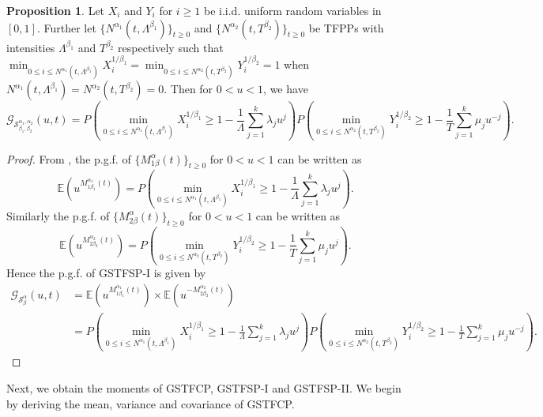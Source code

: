 \documentclass[11pt,oneside,reqno]{amsart}
\theoremstyle{definition}
\newtheorem{proposition}{Proposition}[section]
\theoremstyle{remarkstyle}
\begin{document}
\begin{proposition}
Let $X_i$ and $Y_i$ for $i\ge 1$ be i.i.d. uniform random variables in $[0,1]$. Further let $\{N^{\alpha_1}(t,\Lambda^{\beta_1})\}_{t\ge 0}$ and $\{N^{\alpha_2}(t,T^{\beta_2})\}_{t\ge 0}$ be TFPPs with intensities $\Lambda^{\beta_1}$ and $T^{\beta_2}$ respectively such that $\min_{0\le i\le N^{\alpha_1}(t,\Lambda^{\beta_1})}X^{1/\beta_1}_{i}=\min_{0\le i\le N^{\alpha_2}(t,T^{\beta_2})}Y^{1/\beta_2}_{i}=1$ when $N^{\alpha_1}(t,\Lambda^{\beta_1})=N^{\alpha_2}(t,T^{\beta_2})=0$. Then for $0<u<1$, we have
\begin{equation*}
\mathcal{G}_{\mathcal{S}^{\alpha_1,\alpha_2}_{\beta_1,\beta_2}}(u,t)=P(\min_{0\le i\le N^{\alpha_1}(t,\Lambda^{\beta_1})}X^{1/\beta_1}_{i}\ge 1-\frac{1}{\Lambda}\sum_{j=1}^{k}\lambda_j u^{j})P(\min_{0\le i\le N^{\alpha_2}(t,T^{\beta_2})}Y^{1/\beta_2}_{i}\ge 1-\frac{1}{T}\sum_{j=1}^{k}\mu_j u^{-j}).
\end{equation*}
\end{proposition}
\begin{proof}
From \citet{Katariaarxiv}, the p.g.f. of $\{M_{1\beta}^{\alpha}(t)\}_{t\ge 0}$ for $0<u<1$ can be written as 
\begin{equation*}
\mathbb{E}(u^{M_{1\beta_1}^{\alpha_1}(t)}) = P(\min_{0\le i\le N^{\alpha_1}(t,\Lambda^{\beta_1})}X^{1/\beta_1}_{i}\ge 1-\frac{1}{\Lambda}\sum_{j=1}^{k}\lambda_j u^{j}).
\end{equation*}
Similarly the p.g.f. of $\{M_{2\beta}^{\alpha}(t)\}_{t\ge 0}$ for $0<u<1$ can be written as
\begin{equation*}
\mathbb{E}(u^{M_{2\beta_2}^{\alpha_2}(t)}) = P(\min_{0\le i\le N^{\alpha_2}(t,T^{\beta_2})}Y^{1/\beta_2}_{i}\ge 1-\frac{1}{T}\sum_{j=1}^{k}\mu_j u^{j}).
\end{equation*}
Hence the p.g.f. of GSTFSP-I is given by 
\begin{align*}
\mathcal{G}_{\mathcal{S}^{\alpha}_{\beta}}(u,t)&=\mathbb{E}(u^{M_{1\beta_1}^{\alpha_1}(t)})\times\mathbb{E}(u^{-M_{2\beta_2}^{\alpha_2}(t)})\nonumber\\
&=P(\min_{0\le i\le N^{\alpha_1}(t,\Lambda^{\beta_1})}X^{1/\beta_1}_{i}\ge 1-\frac{1}{\Lambda}\sum_{j=1}^{k}\lambda_j u^{j})P(\min_{0\le i\le N^{\alpha_2}(t,T^{\beta_2})}Y^{1/\beta_2}_{i}\ge 1-\frac{1}{T}\sum_{j=1}^{k}\mu_j u^{-j}).
\end{align*}
\end{proof}
Next, we obtain the moments of GSTFCP, GSTFSP-I and GSTFSP-II. We begin by deriving the mean, variance and covariance of GSTFCP.
\end{document}

